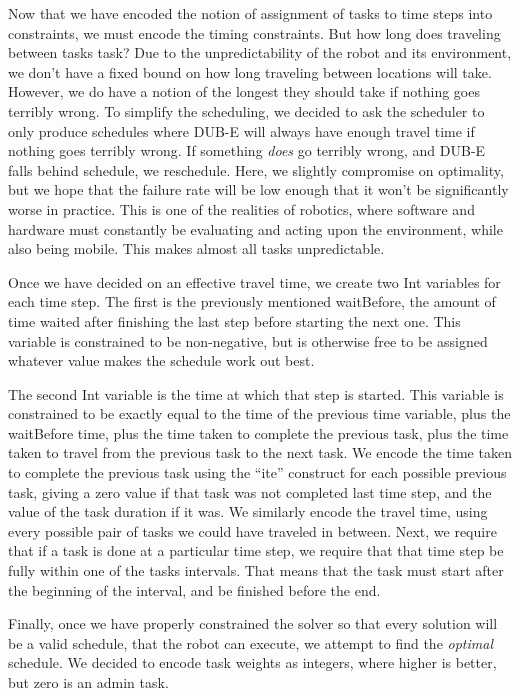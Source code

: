 \documentclass[11pt]{article}
\begin{document}
Now that we have encoded
the notion of assignment of tasks to time steps
into constraints,
we must encode the timing constraints.
But how long does traveling between tasks task?
Due to the unpredictability of the robot and its environment,
we don't have a fixed bound on how long traveling between locations will take.
However, we do have a notion of the longest they should take
if nothing goes terribly wrong.
To simplify the scheduling,
we decided to ask the scheduler to only produce
schedules where DUB-E will always have enough travel time
if nothing goes terribly wrong.
If something \textit{does} go terribly wrong,
and DUB-E falls behind schedule,
we reschedule.
Here, we slightly compromise on optimality,
but we hope that the failure rate
will be low enough that
it won't be significantly worse in practice.
This is one of the realities of robotics, where
software and hardware must constantly be evaluating
and acting upon the environment, while also being mobile.
This makes almost all tasks unpredictable.

Once we have decided on an effective travel time,
we create two Int variables for each time step.
The first is the previously mentioned waitBefore,
the amount of time waited after finishing the last step
before starting the next one.
This variable is constrained to be non-negative,
but is otherwise free to be assigned whatever value
makes the schedule work out best.

The second Int variable
is the time at which that step is started.
This variable is constrained
to be exactly equal to the time
of the previous time variable,
plus the waitBefore time,
plus the time taken to complete the previous task,
plus the time taken to travel
from the previous task to the next task.
We encode the time taken to complete the previous task
using the ``ite'' construct for each possible previous task,
giving a zero value if that task was not completed last time step,
and the value of the task duration if it was.
We similarly encode the travel time,
using every possible pair of tasks we could have traveled in between.
Next, we require that if a task is done at a particular time step,
we require that that time step be fully within one of the tasks intervals.
That means that the task must start after the beginning of the interval,
and be finished before the end.

Finally, once we have properly constrained the solver
so that every solution will be a valid schedule,
that the robot can execute,
we attempt to find the \textit{optimal} schedule.
We decided to encode task weights as integers,
where higher is better,
but zero is an admin task.
\end{document}
